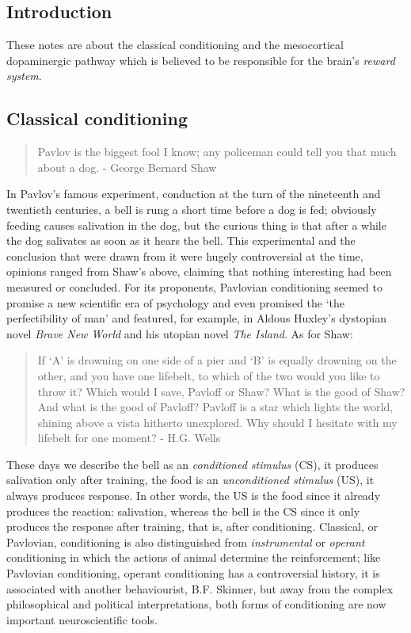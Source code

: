 \documentclass[11pt,a4paper]{scrartcl}
\begin{document}
\subsection*{Introduction}
These notes are about the classical conditioning and the mesocortical
dopaminergic pathway which is believed to be responsible for the
brain's \textsl{reward system}. 

\subsection*{Classical conditioning}

\begin{quote}
Pavlov is the biggest fool I know; any policeman could tell you that much
about a dog. - George Bernard Shaw
\end{quote}

In Pavlov's famous experiment, conduction at the turn of the
nineteenth and twentieth centuries, a bell is rung a short time before
a dog is fed; obviously feeding causes salivation in the dog, but the
curious thing is that after a while the dog salivates as soon as it
hears the bell. This experimental and the conclusion that were drawn
from it were hugely controversial at the time, opinions ranged from
Shaw's above, claiming that nothing interesting had been measured or
concluded.  For its proponents, Pavlovian conditioning seemed to
promise a new scientific era of psychology and even promised the
\lq{}the perfectibility of man\rq{} and featured, for example, in
Aldous Huxley's dystopian novel \textsl{Brave New World} and his
utopian novel \textsl{The Island}. As for Shaw:
\begin{quote}
If ‘A’ is drowning on one side of a pier and ‘B’ is equally drowning on the
other, and you have one lifebelt, to which of the two would you like to throw
it? Which would I save, Pavloff or Shaw? What is the good of Shaw? And
what is the good of Pavloff? Pavloff is a star which lights the world, shining
above a vista hitherto unexplored. Why should I hesitate with my lifebelt for
one moment? - H.G. Wells
\end{quote}

These days we describe the bell as an \textsl{conditioned stimulus}
(CS), it produces salivation only after training, the food is an
\textsl{unconditioned stimulus} (US), it always produces response. In
other words, the US is the food since it already produces the
reaction: salivation, whereas the bell is the CS since it only
produces the response after training, that is, after
conditioning. Classical, or Pavlovian, conditioning is also
distinguished from \textsl{instrumental} or \textsl{operant}
conditioning in which the actions of animal determine the
reinforcement; like Pavlovian conditioning, operant conditioning has a
controversial history, it is associated with another behaviourist,
B.F. Skinner, but away from the complex philosophical and political
interpretations, both forms of conditioning are now important
neuroscientific tools.
\end{document}
